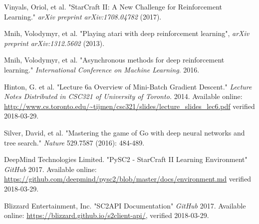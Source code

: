 \documentclass{article}
\begin{document}
\begin{thebibliography}{alpha}
 Vinyals, Oriol, et al. "StarCraft II: A New Challenge for 
Reinforcement Learning." \emph{arXiv preprint arXiv:1708.04782} (2017).

 Mnih, Volodymyr, et al. "Playing atari with deep 
reinforcement learning", \emph{arXiv preprint arXiv:1312.5602} (2013).

 Mnih, Volodymyr, et al. "Asynchronous methods for deep 
reinforcement learning." \emph{International Conference on Machine Learning}. 
2016.

 Hinton, G. et al. "Lecture 6a Overview of Mini-Batch 
Gradient Descent." \emph{Lecture Notes Distributed in CSC321 of University of 
Toronto.} 2014. Available online: 
\url{http://www.cs.toronto.edu/~tijmen/csc321/slides/lecture_slides_lec6.pdf} 
verified 2018-03-29.

 Silver, David, et al. "Mastering the game of Go with deep 
neural networks and tree search." \emph{Nature} 529.7587 (2016): 484-489.

 DeepMind Technologies Limited. "PySC2 - StarCraft II 
Learning Environment" \emph{GitHub} 2017. Available online: 
\url{https://github.com/deepmind/pysc2/blob/master/docs/environment.md} 
verified 2018-03-29.

 Blizzard Entertainment, Inc. "SC2API Documentation" 
\emph{GitHub} 2017. Available online: 
\url{https://blizzard.github.io/s2client-api/}, verified 2018-03-29.

\end{thebibliography}
\end{document}
